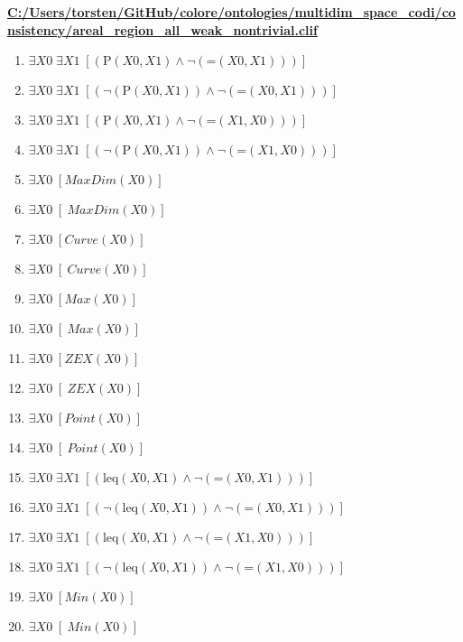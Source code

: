 \documentclass{article}
\begin{document}
\textbf{\url{C:/Users/torsten/GitHub/colore/ontologies/multidim\_space\_codi/consistency/areal\_region\_all\_weak\_nontrivial.clif}}

\begin{enumerate}
\item $\exists X0\; \exists X1\;  \left[ \left(\textrm{P}(X0,X1) \land \neg \left(\textrm{=}(X0,X1)\right)\right) \right]$
\item $\exists X0\; \exists X1\;  \left[ \left(\neg \left(\textrm{P}(X0,X1)\right) \land \neg \left(\textrm{=}(X0,X1)\right)\right) \right]$
\item $\exists X0\; \exists X1\;  \left[ \left(\textrm{P}(X0,X1) \land \neg \left(\textrm{=}(X1,X0)\right)\right) \right]$
\item $\exists X0\; \exists X1\;  \left[ \left(\neg \left(\textrm{P}(X0,X1)\right) \land \neg \left(\textrm{=}(X1,X0)\right)\right) \right]$
\item $\exists X0\;  \left[ MaxDim(X0) \right]$
\item $\exists X0\;  \left[ ~MaxDim(X0) \right]$
\item $\exists X0\;  \left[ Curve(X0) \right]$
\item $\exists X0\;  \left[ ~Curve(X0) \right]$
\item $\exists X0\;  \left[ Max(X0) \right]$
\item $\exists X0\;  \left[ ~Max(X0) \right]$
\item $\exists X0\;  \left[ ZEX(X0) \right]$
\item $\exists X0\;  \left[ ~ZEX(X0) \right]$
\item $\exists X0\;  \left[ Point(X0) \right]$
\item $\exists X0\;  \left[ ~Point(X0) \right]$
\item $\exists X0\; \exists X1\;  \left[ \left(\textrm{leq}(X0,X1) \land \neg \left(\textrm{=}(X0,X1)\right)\right) \right]$
\item $\exists X0\; \exists X1\;  \left[ \left(\neg \left(\textrm{leq}(X0,X1)\right) \land \neg \left(\textrm{=}(X0,X1)\right)\right) \right]$
\item $\exists X0\; \exists X1\;  \left[ \left(\textrm{leq}(X0,X1) \land \neg \left(\textrm{=}(X1,X0)\right)\right) \right]$
\item $\exists X0\; \exists X1\;  \left[ \left(\neg \left(\textrm{leq}(X0,X1)\right) \land \neg \left(\textrm{=}(X1,X0)\right)\right) \right]$
\item $\exists X0\;  \left[ Min(X0) \right]$
\item $\exists X0\;  \left[ ~Min(X0) \right]$

\end{enumerate}
\end{document}
